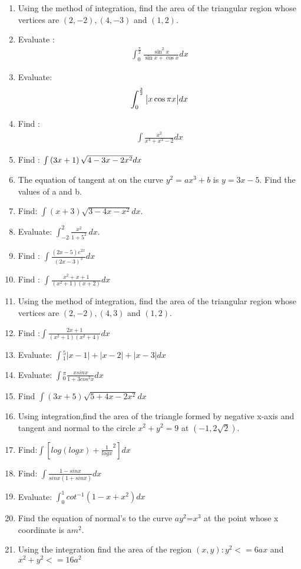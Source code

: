 \begin{enumerate}
    \item Using the method of integration, find the area of the triangular region whose vertices are $(2,-2), (4,-3)$ and $(1,2)$.
    \item Evaluate :
          \begin{align*}
              \int_{0}^\frac{\pi}{2}{\frac{\sin^2x}{\sin x+ \cos x}}{dx}
          \end{align*}
    \item Evaluate:
          \begin{align*}
              \int_{0}^\frac{3}{2}{\begin{vmatrix}x \cos \pi x\end{vmatrix}}dx
          \end{align*}
    \item Find :
          \begin{align*}
              \int{\frac{x^2}{x^4+x^2-2}}dx
          \end{align*}
    \item Find : $\int{\ensuremath{\left(3x + 1\right)} \sqrt{4-3x-2x^2}}dx $
    \item The equation of tangent at  on the curve $y^2=ax^3+b$ is $y=3x-5$. Find the values of a and b.
    \item Find: $\int(x+3)\sqrt{3-4x-x^2} dx$.
    \item Evaluate: \(\int_{-2}^{2}\frac{x^2}{1+5^2}\,dx\).
    \item Find : $\int{\frac{(2x-5)e^{2x}}{(2x-3)^3}}dx$
    \item Find : $\int{\frac{x^2+x+1}{(x^2+1)(x+2)}}dx$
    \item Using the method of integration, find the area of the triangular region whose vertices are $(2, -2),(4,3)$ and $(1,2)$.
    \item Find :$ \int{\frac{2x+1}{(x^{2}+1)(x^{2}+4)}}dx$
    \item Evaluate: $\int{^5_1{|x-1|+|x-2|+|x-3|}dx}$
    \item Evaluate: $\int{^\pi_0\frac{xsinx}{1+3cos^{2}x}}dx$
    \item Find $\int(3x+5)\sqrt{5+4x-2x^{2}}dx$
    \item Using integration,find the area of the triangle formed by negative x-axis and tangent and normal to the circle $x^{2}+y^{2}=9$ at $(-1,2\sqrt{2})$.
    \item Find:$\int[log(logx)+\frac{1}{logx}^2]dx$
    \item Find: $\int\frac{1-sinx}{sinx(1+sinx)}dx$
    \item Evaluate: $ \int_{0}^{1}cot^{-1}(1-x+x^{2})dx$
    \item Find the equation of normal's to the curve $ay^{2}$=$x^{3}$ at the point whose x coordinate is a$m^{2}$.
    \item Using the integration find the area of the region
          $ (x,y):y^{2}<=6ax$ and $x^{2}+y^{2}<=16a^{2}$

\end{enumerate}

